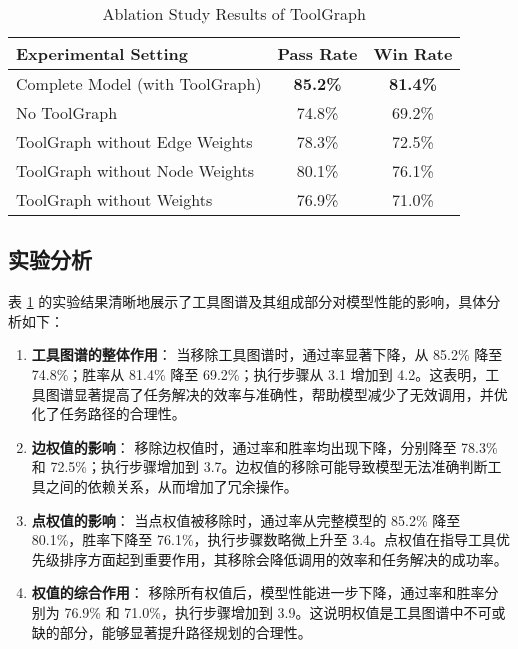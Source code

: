\begin{table}[h]
  \centering
  \caption{Ablation Study Results of ToolGraph}
  \begin{tabular}{l|c|c}
  \toprule
  \textbf{Experimental Setting}            & \textbf{Pass Rate} & \textbf{Win Rate} \\ \midrule
  Complete Model (with ToolGraph)          & \textbf{85.2\%}    & \textbf{81.4\%}   \\
  No ToolGraph                             & 74.8\%             & 69.2\%            \\
  ToolGraph without Edge Weights           & 78.3\%             & 72.5\%            \\
  ToolGraph without Node Weights           & 80.1\%             & 76.1\%            \\
  ToolGraph without Weights                & 76.9\%             & 71.0\%            \\ 
  \bottomrule
  \end{tabular}
  \label{tab:ablation}
\end{table}

  \subsection{实验分析}

  表 \ref{tab:ablation} 的实验结果清晰地展示了工具图谱及其组成部分对模型性能的影响，具体分析如下：
  
  \begin{enumerate}
      \item \textbf{工具图谱的整体作用}：
      当移除工具图谱时，通过率显著下降，从 85.2\% 降至 74.8\%；胜率从 81.4\% 降至 69.2\%；执行步骤从 3.1 增加到 4.2。这表明，工具图谱显著提高了任务解决的效率与准确性，帮助模型减少了无效调用，并优化了任务路径的合理性。
      
      \item \textbf{边权值的影响}： 
      移除边权值时，通过率和胜率均出现下降，分别降至 78.3\% 和 72.5\%；执行步骤增加到 3.7。边权值的移除可能导致模型无法准确判断工具之间的依赖关系，从而增加了冗余操作。
      
      \item \textbf{点权值的影响}：
      当点权值被移除时，通过率从完整模型的 85.2\% 降至 80.1\%，胜率下降至 76.1\%，执行步骤数略微上升至 3.4。点权值在指导工具优先级排序方面起到重要作用，其移除会降低调用的效率和任务解决的成功率。
      
      \item \textbf{权值的综合作用}：
      移除所有权值后，模型性能进一步下降，通过率和胜率分别为 76.9\% 和 71.0\%，执行步骤增加到 3.9。这说明权值是工具图谱中不可或缺的部分，能够显著提升路径规划的合理性。
  \end{enumerate}

